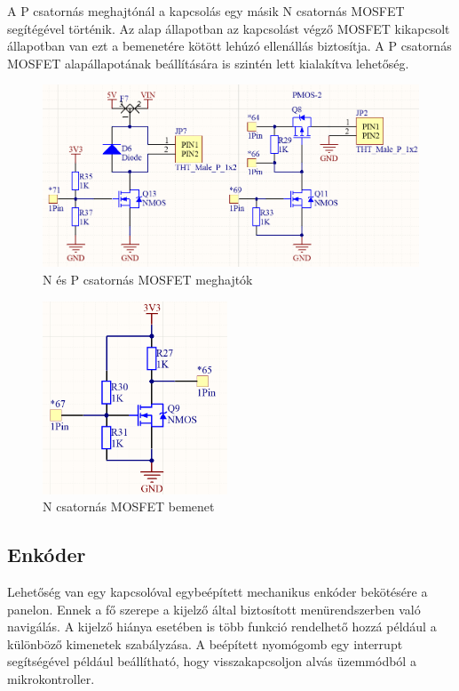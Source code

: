 A P csatornás meghajtónál a kapcsolás egy másik N csatornás MOSFET segítégével történik. Az alap állapotban az kapcsolást végző MOSFET kikapcsolt állapotban van ezt a bemenetére kötött lehúzó ellenállás biztosítja. A P csatornás MOSFET alapállapotának beállítására is szintén lett kialakítva lehetőség.

\begin{figure}[!ht]
    \centering
    \includegraphics[width=140mm, keepaspectratio]{figures/n_p_driver.png}
    \caption{N és P csatornás MOSFET meghajtók}
    \label{fig:p_channel_mosfet}
\end{figure}

\begin{figure}[!ht]
    \centering
    \includegraphics[width=55mm, keepaspectratio]{figures/n_input.png}
    \caption{N csatornás MOSFET bemenet}
    \label{fig:n_channel_mosfet}
\end{figure}







\subsection{Enkóder}
Lehetőség van egy kapcsolóval egybeépített mechanikus enkóder bekötésére a panelon. Ennek a fő szerepe a kijelző által biztosított menürendszerben való navigálás. A kijelző hiánya esetében is több funkció rendelhető hozzá például a különböző kimenetek szabályzása. A beépített nyomógomb egy interrupt segítségével például beállítható, hogy visszakapcsoljon alvás üzemmódból a mikrokontroller.
